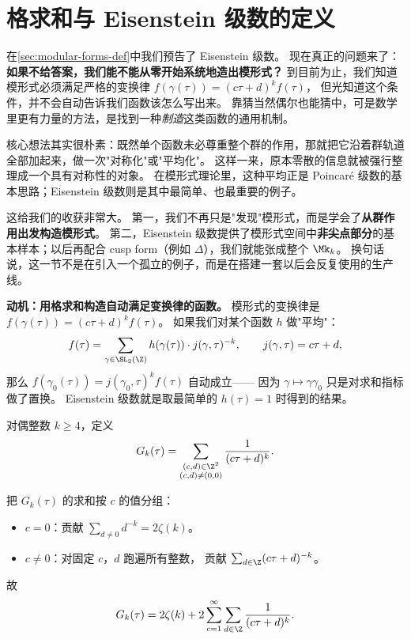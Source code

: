 \section{格求和与 Eisenstein 级数的定义}
\label{sec:lattice-sum-eisenstein}

在\cref{sec:modular-forms-def}中我们预告了 Eisenstein 级数。
现在真正的问题来了：\textbf{如果不给答案，我们能不能从零开始系统地造出模形式？}
到目前为止，我们知道模形式必须满足严格的变换律
$f(\gamma(\tau)) = (c\tau + d)^k f(\tau)$，
但光知道这个条件，并不会自动告诉我们函数该怎么写出来。
靠猜当然偶尔也能猜中，可是数学里更有力量的方法，是找到一种\emph{制造}这类函数的通用机制。

核心想法其实很朴素：既然单个函数未必尊重整个群的作用，那就把它沿着群轨道全部加起来，做一次"对称化"或"平均化"。
这样一来，原本零散的信息就被强行整理成一个具有对称性的对象。
在模形式理论里，这种平均正是 Poincaré 级数的基本思路；Eisenstein 级数则是其中最简单、也最重要的例子。

这给我们的收获非常大。
第一，我们不再只是"发现"模形式，而是学会了\textbf{从群作用出发构造模形式}。
第二，Eisenstein 级数提供了模形式空间中\textbf{非尖点部分}的基本样本；以后再配合 cusp form（例如 $\Delta$），我们就能张成整个 $\Mk_k$。
换句话说，这一节不是在引入一个孤立的例子，而是在搭建一套以后会反复使用的生产线。

\textbf{动机：用格求和构造自动满足变换律的函数。}
模形式的变换律是 $f(\gamma(\tau)) = (c\tau + d)^k f(\tau)$。
如果我们对某个函数 $h$ 做"平均"：
\[
  f(\tau) = \sum_{\gamma \in \SL_2(\Z)} h(\gamma(\tau)) \cdot j(\gamma, \tau)^{-k},
  \qquad j(\gamma, \tau) = c\tau + d,
\]
那么 $f(\gamma_0(\tau)) = j(\gamma_0, \tau)^k f(\tau)$ 自动成立——
因为 $\gamma \mapsto \gamma\gamma_0$ 只是对求和指标做了置换。
Eisenstein 级数就是取最简单的 $h(\tau) = 1$ 时得到的结果。

\begin{definition}[Eisenstein 级数 $G_k$]
\label{def:eisenstein-Gk}
对偶整数 $k \geq 4$，定义
\[
  G_k(\tau) = \sum_{\substack{(c,d) \in \Z^2 \\ (c,d) \neq (0,0)}}
  \frac{1}{(c\tau + d)^k}.
\]
\end{definition}

\begin{example}[前几项展开]
\label{ex:Gk-first-terms}
把 $G_k(\tau)$ 的求和按 $c$ 的值分组：
\begin{itemize}
  \item $c = 0$：贡献 $\sum_{d \neq 0} d^{-k} = 2\zeta(k)$。
  \item $c \neq 0$：对固定 $c$，$d$ 跑遍所有整数，
    贡献 $\sum_{d \in \Z} (c\tau + d)^{-k}$。
\end{itemize}
故
\[
  G_k(\tau) = 2\zeta(k) + 2 \sum_{c=1}^{\infty} \sum_{d \in \Z} \frac{1}{(c\tau + d)^k}.
\]
\end{example}

